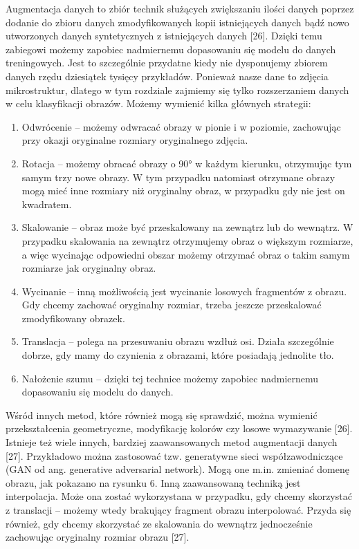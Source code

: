 Augmentacja danych to zbiór technik służących zwiększaniu ilości danych poprzez dodanie do zbioru danych zmodyfikowanych kopii istniejących danych bądź nowo utworzonych danych syntetycznych z istniejących danych [26]. Dzięki temu zabiegowi możemy zapobiec nadmiernemu dopasowaniu się modelu do danych treningowych. Jest to szczególnie przydatne kiedy nie dysponujemy zbiorem danych rzędu dziesiątek tysięcy przykładów. Ponieważ nasze dane to zdjęcia mikrostruktur, dlatego w tym rozdziale zajmiemy się tylko rozszerzaniem danych w celu klasyfikacji obrazów. Możemy wymienić kilka głównych strategii:

\begin{enumerate}
	\item Odwrócenie – możemy odwracać obrazy w pionie i w poziomie, zachowując przy okazji oryginalne rozmiary oryginalnego zdjęcia.

	\item Rotacja – możemy obracać obrazy o 90° w każdym kierunku, otrzymując tym samym trzy nowe obrazy. W tym przypadku natomiast otrzymane obrazy mogą mieć inne rozmiary niż oryginalny obraz, w przypadku gdy nie jest on kwadratem.

	\item Skalowanie – obraz może być przeskalowany na zewnątrz lub do wewnątrz. W przypadku skalowania na zewnątrz otrzymujemy obraz o większym rozmiarze, a więc wycinając odpowiedni obszar możemy otrzymać obraz o takim samym rozmiarze jak oryginalny obraz.

	\item Wycinanie – inną możliwością jest wycinanie losowych fragmentów z obrazu. Gdy chcemy zachować oryginalny rozmiar, trzeba jeszcze przeskalować zmodyfikowany obrazek.

	\item Translacja – polega na przesuwaniu obrazu wzdłuż osi. Działa szczególnie dobrze, gdy mamy do czynienia z obrazami, które posiadają jednolite tło.

	\item Nałożenie szumu – dzięki tej technice możemy zapobiec nadmiernemu dopasowaniu się modelu do danych. 
\end{enumerate}

Wśród innych metod, które również mogą się sprawdzić, można wymienić przekształcenia geometryczne, modyfikację kolorów czy losowe wymazywanie [26]. Istnieje też wiele innych, bardziej zaawansowanych metod augmentacji danych [27]. Przykładowo można zastosować tzw. generatywne sieci współzawodniczące (GAN od ang. generative adversarial network). Mogą one m.in. zmieniać domenę obrazu, jak pokazano na rysunku 6. Inną zaawansowaną techniką jest interpolacja. Może ona zostać wykorzystana w przypadku, gdy chcemy skorzystać z translacji – możemy wtedy brakujący fragment obrazu interpolować. Przyda się również, gdy chcemy skorzystać ze skalowania do wewnątrz jednocześnie zachowując oryginalny rozmiar obrazu [27]. 

